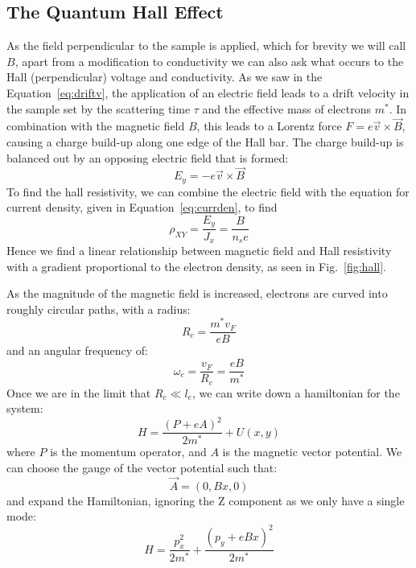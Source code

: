\subsection{The Quantum Hall Effect}
As the field perpendicular to the sample is applied, which for brevity we will call $B$, apart from a modification to conductivity
we can also ask what occurs to the Hall (perpendicular) voltage and conductivity. As we saw in the Equation~\ref{eq:driftv},
the application of an electric field leads to a drift velocity in the sample set by the scattering
time $\tau$ and the effective mass of electrons $m^*$. In combination with the magnetic field $B$, this leads to a Lorentz force $F = e \vec v \times \vec B$, causing
a charge build-up along one edge of the Hall bar. The charge build-up is balanced out by an opposing electric field that is formed:
\begin{equation}
  E_y = -e \vec v \times \vec B
\end{equation}
To find the hall resistivity, we can combine the electric field with the equation for current density, given in Equation~\ref{eq:currden}, to find
\begin{equation}
  \rho_{XY} = \frac{E_y}{J_x} = \frac{B}{n_s e}
\end{equation}
Hence we find a linear relationship between magnetic field and Hall resistivity with a gradient proportional to the electron density, as seen in Fig.~\ref{fig:hall}.

As the magnitude of the magnetic field is increased, electrons are curved into roughly circular paths, with a radius:
\begin{equation}
  R_c = \frac{m^* v_F}{e B}
\end{equation}
and an angular frequency of:
\begin{equation}
  \omega_c = \frac{v_F}{R_c} = \frac{e B}{m^*}
  \label{eq:cycl}
\end{equation}
Once we are in the limit that $R_c \ll l_e$, we can write down a hamiltonian for the system:
\begin{equation}
  H = \frac{(P + eA)^2}{2m^*} + U(x, y)
\end{equation}
where $P$ is the momentum operator, and $A$ is the magnetic vector potential. We can choose the gauge of the vector potential such
that:
\begin{equation}
  \vec{A} = (0, Bx, 0)
\end{equation}
and expand the Hamiltonian, ignoring the Z component as we only have a single mode:
\begin{equation}
  H = \frac{p_x^2}{2m^*} + \frac{(p_y + eBx)^2}{2m^*}
\end{equation}

